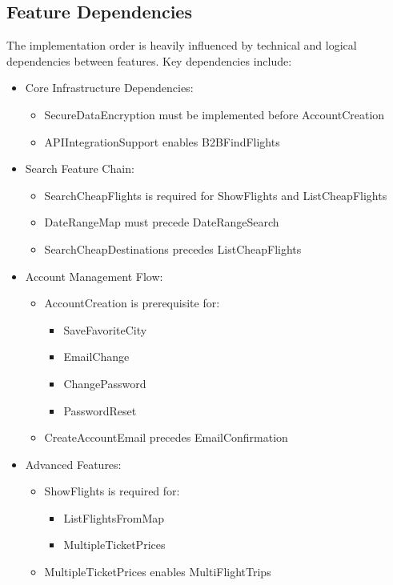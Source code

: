\subsection{Feature Dependencies}
The implementation order is heavily influenced by technical and logical dependencies between features. Key dependencies include:

\begin{itemize}
\item Core Infrastructure Dependencies:
  \begin{itemize}
  \item SecureDataEncryption must be implemented before AccountCreation
  \item APIIntegrationSupport enables B2BFindFlights
  \end{itemize}

\item Search Feature Chain:
  \begin{itemize}
  \item SearchCheapFlights is required for ShowFlights and ListCheapFlights
  \item DateRangeMap must precede DateRangeSearch
  \item SearchCheapDestinations precedes ListCheapFlights
  \end{itemize}

\item Account Management Flow:
  \begin{itemize}
  \item AccountCreation is prerequisite for:
    \begin{itemize}
    \item SaveFavoriteCity
    \item EmailChange
    \item ChangePassword
    \item PasswordReset
    \end{itemize}
  \item CreateAccountEmail precedes EmailConfirmation
  \end{itemize}

\item Advanced Features:
  \begin{itemize}
  \item ShowFlights is required for:
    \begin{itemize}
    \item ListFlightsFromMap
    \item MultipleTicketPrices
    \end{itemize}
  \item MultipleTicketPrices enables MultiFlightTrips
  \end{itemize}
\end{itemize}

